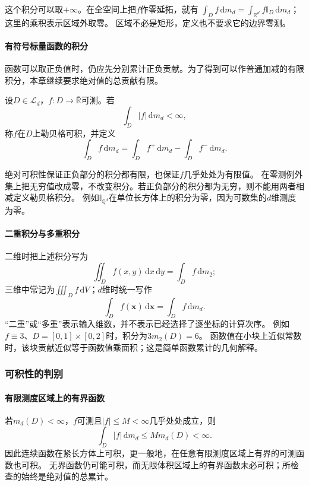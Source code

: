 这个积分可以取$+\infty$。在全空间上把$f$作零延拓，就有
$\int_Df\,\mathrm dm_d=\int_{\mathbb R^d}f\mathbb I_D\,\mathrm dm_d$；这里的乘积表示区域外取零。
区域不必是矩形，定义也不要求它的边界零测。

\paragraph{有符号标量函数的积分}

函数可以取正负值时，仍应先分别累计正负贡献。为了得到可以作普通加减的有限积分，本章继续要求绝对值的总贡献有限。
\begin{definition}[区域上的勒贝格可积性]
设$D\in\mathcal L_d$，$f:D\to\overline{\mathbb R}$可测。若
\begin{equation}
 \int_D|f|\,\mathrm dm_d<\infty,
 \label{eq:multivariable-lebesgue-integrability}
\end{equation}
称$f$在$D$上勒贝格可积，并定义
\[
 \int_Df\,\mathrm dm_d=\int_Df^+\,\mathrm dm_d-\int_Df^-\,\mathrm dm_d.
\]
\end{definition}

绝对可积性保证正负部分的积分都有限，也保证$f$几乎处处为有限值。
在零测例外集上把无穷值改成零，不改变积分。若正负部分的积分都为无穷，则不能用两者相减定义勒贝格积分。
例如$\mathbb I_{\mathbb Q^d}$在单位长方体上的积分为零，因为可数集的$d$维测度为零。

\paragraph{二重积分与多重积分}

二维时把上述积分写为
\[
 \iint_Df(x,y)\,\mathrm dx\,\mathrm dy=\int_Df\,\mathrm dm_2;
\]
三维中常记为$\iiint_Df\,\mathrm dV$；$d$维时统一写作
\[
 \int_Df(\bm x)\,\mathrm d\bm x=\int_Df\,\mathrm dm_d.
\]
“二重”或“多重”表示输入维数，并不表示已经选择了逐坐标的计算次序。
例如$f\equiv3$、$D=[0,1]\times[0,2]$时，积分为$3m_2(D)=6$。
函数值在小块上近似常数时，该块贡献近似等于函数值乘面积；这是简单函数累计的几何解释。

\subsubsection{可积性的判别}

\paragraph{有限测度区域上的有界函数}

若$m_d(D)<\infty$，$f$可测且$|f|\leq M<\infty$几乎处处成立，则
\[
 \int_D|f|\,\mathrm dm_d\leq M m_d(D)<\infty.
\]
因此连续函数在紧长方体上可积，更一般地，在任意有限测度区域上有界的可测函数也可积。
无界函数仍可能可积，而无限体积区域上的有界函数未必可积；所检查的始终是绝对值的总累计。

